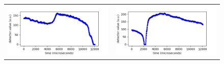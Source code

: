 \begin{figure}[H]
  \noindent
  \centering
  \begin{longtable}{p{7cm}p{7cm}}
    \includegraphics[width=8cm]{Images/RawData_Hijau_Data10-01.png}
    &
    \includegraphics[width=8cm]{Images/RawData_Merah_Data9-01.png}
  \end{longtable}
\end{figure}
